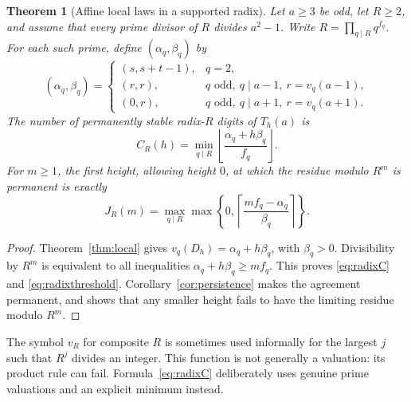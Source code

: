 \documentclass[11pt,letterpaper]{article}
\numberwithin{equation}{section}
\newtheorem{theorem}{Theorem}[section]
\theoremstyle{definition}
\theoremstyle{remark}
\newcommand{\ceil}[1]{\left\lceil #1\right\rceil}
\newcommand{\floor}[1]{\left\lfloor #1\right\rfloor}
\begin{document}
\begin{theorem}[Affine local laws in a supported radix]\label{thm:general-radix}
Let $a\ge3$ be odd, let $R\ge2$, and assume that every prime divisor of $R$ divides $a^2-1$. Write $R=\prod_{q\mid R}q^{f_q}$. For each such prime, define $(\alpha_q,\beta_q)$ by
\[
 (\alpha_q,\beta_q)=
 \begin{cases}
 (s,s+t-1),&q=2,\\
 (r,r),&q\text{ odd},\ q\mid a-1,\ r=v_q(a-1),\\
 (0,r),&q\text{ odd},\ q\mid a+1,\ r=v_q(a+1).
 \end{cases}
\]
The number of permanently stable radix-$R$ digits of $T_h(a)$ is
\begin{equation}\label{eq:radixC}
 C_R(h)=\min_{q\mid R}\floor{\frac{\alpha_q+h\beta_q}{f_q}}.
\end{equation}
For $m\ge1$, the first height, allowing height $0$, at which the residue modulo $R^m$ is permanent is exactly
\begin{equation}\label{eq:radixthreshold}
 J_R(m)=\max_{q\mid R}\max\left\{0,
       \ceil{\frac{mf_q-\alpha_q}{\beta_q}}\right\}.
\end{equation}
\end{theorem}
\begin{proof}
Theorem~\ref{thm:local} gives $v_q(D_h)=\alpha_q+h\beta_q$, with $\beta_q>0$. Divisibility by $R^m$ is equivalent to all inequalities $\alpha_q+h\beta_q\ge mf_q$. This proves \eqref{eq:radixC} and \eqref{eq:radixthreshold}. Corollary~\ref{cor:persistence} makes the agreement permanent, and shows that any smaller height fails to have the limiting residue modulo $R^m$.
\end{proof}

The symbol $v_R$ for composite $R$ is sometimes used informally for the largest $j$ such that $R^j$ divides an integer. This function is not generally a valuation: its product rule can fail. Formula~\eqref{eq:radixC} deliberately uses genuine prime valuations and an explicit minimum instead.
\end{document}
